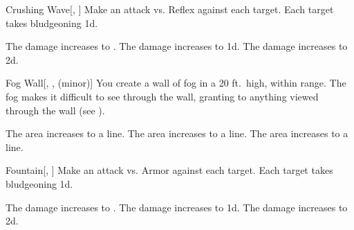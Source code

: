 \lowercase{\hypertarget{spell:Crushing Wave}{}}\label{spell:Crushing Wave}
\begin{freeability}[Rank 1]{\hypertarget{spell:Crushing Wave}{Crushing Wave}}[, ]
Make an attack vs. Reflex against each target.
\hit Each target takes bludgeoning  \minus1d.

\rankline
{} The damage increases to .
 The damage increases to  \plus1d.
 The damage increases to  \plus2d.
\end{freeability}
\vspace{0.25em}



\lowercase{\hypertarget{spell:Fog Wall}{}}\label{spell:Fog Wall}
\begin{freeability}[Rank 1]{\hypertarget{spell:Fog Wall}{Fog Wall}}[, ,  (minor)]
\targetrule
You create a wall of fog in a 20 ft.\ high, \arealarge {} within \rngmed range.
The fog makes it difficult to see through the wall, granting  to anything viewed through the wall (see ).

\rankline
{} The area increases to a \arealarge line.
 The area increases to a \areahuge line.
 The area increases to a \areaext line.
\end{freeability}
\vspace{0.25em}



\lowercase{\hypertarget{spell:Fountain}{}}\label{spell:Fountain}
\begin{freeability}[Rank 1]{\hypertarget{spell:Fountain}{Fountain}}[, ]
Make an attack vs. Armor against each target.
\hit Each target takes bludgeoning  \minus1d.

\rankline
{} The damage increases to .
 The damage increases to  \plus1d.
 The damage increases to  \plus2d.
\end{freeability}
\vspace{0.25em}



